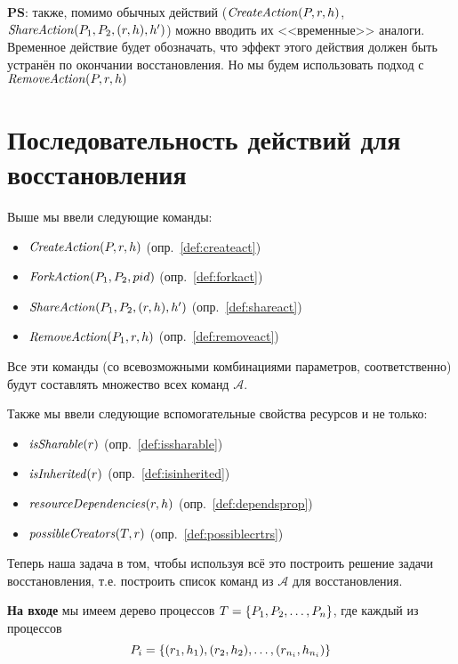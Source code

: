 \begin{note}
\textbf{PS}: также, помимо обычных действий ($\text{\textit{CreateAction}}(P, r, h)$, $\text{\textit{ShareAction}}(P_1, P_2, (r, h), h')$) можно вводить их <<временные>> аналоги. Временное действие будет обозначать, что эффект этого действия должен быть устранён по окончании восстановления. Но мы будем использовать подход с $\text{\textit{RemoveAction}}(P, r, h)$
\end{note}

\section{Последовательность действий для восстановления}

Выше мы ввели следующие команды:

\begin{itemize}
	\item $\text{\textit{CreateAction}}(P, r, h)$ (опр.~\ref{def:createact})
	\item $\text{\textit{ForkAction}}(P_1, P_2, pid)$ (опр.~\ref{def:forkact})
	\item $\text{\textit{ShareAction}}(P_1, P_2, (r, h), h')$ (опр.~\ref{def:shareact})
	\item $\text{\textit{RemoveAction}}(P_1, r, h)$ (опр.~\ref{def:removeact})
\end{itemize}

Все эти команды (со всевозможными комбинациями параметров, соответственно) будут составлять множество всех команд $\mathcal{A}$.

Также мы ввели следующие вспомогательные свойства ресурсов и не только:

\begin{itemize}
	\item $\text{\textit{isSharable}}(r)$ (опр.~\ref{def:issharable})
	\item $\text{\textit{isInherited}}(r)$ (опр.~\ref{def:isinherited})
	\item $\text{\textit{resourceDependencies}}(r, h)$ (опр.~\ref{def:dependsprop})
	\item $\text{\textit{possibleCreators}}(T, r)$ (опр.~\ref{def:possiblecrtrs})
\end{itemize}

Теперь наша задача в том, чтобы используя всё это построить решение задачи восстановления, т.е. построить список команд из $\mathcal{A}$ для восстановления.

\textbf{На входе} мы имеем дерево процессов $T = \left\lbrace P_1, P_2, \ldots, P_n \right\rbrace$, где каждый из процессов 
\begin{equation*}
P_i = \left\lbrace (r_1, h_1), (r_2, h_2), \ldots, (r_{n_i}, h_{n_i}) \right\rbrace
\end{equation*}


